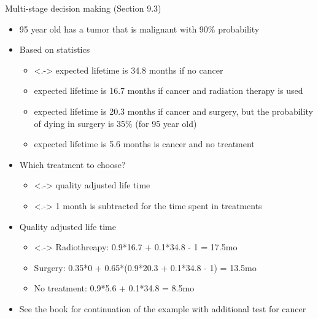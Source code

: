 \documentclass[t]{beamer}
\begin{document}
\begin{frame}

  {\Large\color{navyblue} Multi-stage decision making (Section 9.3)}

  \begin{itemize}
  \item<+-> 95 year old has a tumor that is malignant with 90\% probability
  \item<+-> Based on statistics
    \begin{itemize}
    \item<.-> expected lifetime is 34.8 months if no cancer
    \item<+-> expected lifetime is 16.7 months if cancer and radiation therapy is used
    \item<+-> expected lifetime is 20.3 months if cancer and surgery, but the probability of dying in surgery is 35\% (for 95 year old)
    \item<+-> expected lifetime is 5.6 months is cancer and no treatment
    \end{itemize}
  \item<+-> Which treatment to choose?
    \begin{itemize}
    \item<.-> quality adjusted life time
    \item<.-> 1 month is subtracted for the time spent in treatments
    \end{itemize}
   \item<+-> Quality adjusted life time
    \begin{itemize}
    \item<.-> Radiothreapy: 0.9*16.7 + 0.1*34.8 - 1 = 17.5mo
    \item<+-> Surgery: 0.35*0 + 0.65*(0.9*20.3 + 0.1*34.8 - 1) = 13.5mo
    \item<+-> No treatment: 0.9*5.6 + 0.1*34.8 = 8.5mo
    \end{itemize}
  \item<+-> See the book for continuation of the example with
    additional test for cancer
\end{itemize}

\end{frame}
\end{document}
